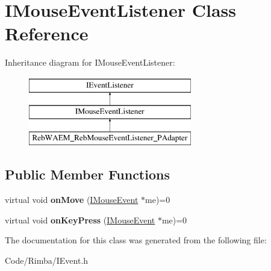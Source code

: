\hypertarget{class_i_mouse_event_listener}{}\section{I\+Mouse\+Event\+Listener Class Reference}
\label{class_i_mouse_event_listener}
Inheritance diagram for I\+Mouse\+Event\+Listener\+:\begin{figure}[H]
\begin{center}
\leavevmode
\includegraphics[height=3.000000cm]{class_i_mouse_event_listener}
\end{center}
\end{figure}
\subsection*{Public Member Functions}
\begin{DoxyCompactItemize}
\item 
virtual void {\bfseries on\+Move} (\hyperlink{class_i_mouse_event}{I\+Mouse\+Event} $\ast$me)=0\hypertarget{class_i_mouse_event_listener_a2fd54983aa8a932e93c792425641c5d1}{}\label{class_i_mouse_event_listener_a2fd54983aa8a932e93c792425641c5d1}

\item 
virtual void {\bfseries on\+Key\+Press} (\hyperlink{class_i_mouse_event}{I\+Mouse\+Event} $\ast$me)=0\hypertarget{class_i_mouse_event_listener_a2ef49eea9335b7fae7fb8fbc3f730e8c}{}\label{class_i_mouse_event_listener_a2ef49eea9335b7fae7fb8fbc3f730e8c}

\end{DoxyCompactItemize}


The documentation for this class was generated from the following file\+:\begin{DoxyCompactItemize}
\item 
Code/\+Rimba/I\+Event.\+h\end{DoxyCompactItemize}
